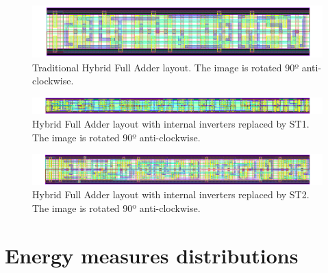 \documentclass[pgmicro,diss,english]{iiufrgs}
\begin{document}
\newpage


\begin{figure}[]
\centering
\includegraphics[width=1.5\textwidth, angle =90]{HYBRID.png}
\caption{Traditional Hybrid Full Adder layout. The image is rotated 90º anti-clockwise.}
\label{fig:HYBRID}
\end{figure}

\newpage
\begin{figure}[]
\centering
\includegraphics[width=1.5\textwidth, angle =90]{HYBRIDST1.png}
\caption{Hybrid Full Adder layout with internal inverters replaced by ST1. The image is rotated 90º anti-clockwise.}
\label{fig:HYBRIDST1}
\end{figure}

\newpage
\begin{figure}[]
\centering
\includegraphics[width=1.5\textwidth, angle =90]{HYBRIDST2.png}
\caption{Hybrid Full Adder layout with internal inverters replaced by ST2. The image is rotated 90º anti-clockwise.}
\label{fig:HYBRIDST2}
\end{figure}


\chapter{Energy measures distributions}

\addtolength{\oddsidemargin}{-.875in}
\addtolength{\evensidemargin}{-.875in}
\addtolength{\textwidth}{1.75in}
\end{document}
